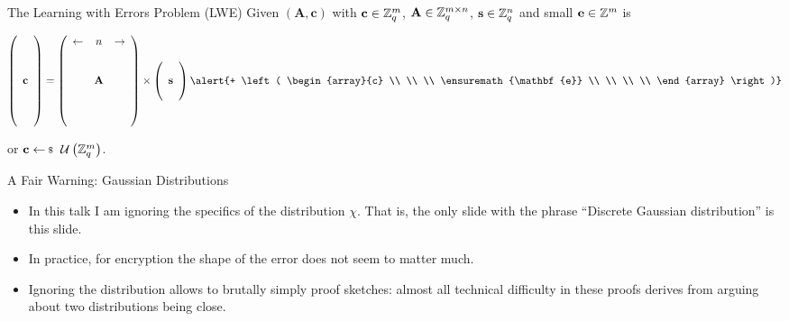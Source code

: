 \documentclass[xcolor=table,10pt,aspectratio=169]{beamer}
\renewcommand{\vec}[1]{\ensuremath{\mathbf{#1}}\xspace}
\begin{document}
\begin{frame}[label={sec:org0da5cea}]{The Learning with Errors Problem (LWE)}
Given \((\vec{A},\vec{c})\) with \(\vec{c} \in \ZZ_q^{m}\), \(\vec{A} \in \ZZ_q^{m \times n}\), \(\vec{s} \in \ZZ_q^{n}\) and \alert{small \(\vec{e} \in \ZZ^{m}\)} is

\begin{align*}
\left(\begin{array}{c}
\\
\\
\\ 
\vec{c} \\
\\
\\
\\
\end{array} \right) = \left(
\begin{array}{ccc}
\leftarrow & n & \rightarrow \\
\\
\\ 
& \vec{A} & \\
\\
\\
\\
\end{array} \right) \times \left( \begin{array}{c}
\\
\vec{s} \\
\\
\end{array} \right) \alert{+ \left(
\begin{array}{c}
\\
\\
\\ 
\vec{e} \\
\\
\\
\\
\end{array} 
\right)}
\end{align*}

or \(\vec{c} \sample \mathcal{U}\left(\ZZ_q^{m}\right)\).
\end{frame}
\begin{frame}[label={sec:org5d17a84}]{A Fair Warning: Gaussian Distributions}
\begin{itemize}
\item In this talk I am ignoring the specifics of the distribution \(\chi\). That is, the only slide with the phrase ``Discrete Gaussian distribution'' is this slide.

\item In practice, \alert{for encryption} the shape of the error does not seem to matter much.

\item Ignoring the distribution allows to brutally simply proof sketches: almost all technical difficulty in these proofs derives from arguing about two distributions being close.
\end{itemize}
\end{frame}
\end{document}

